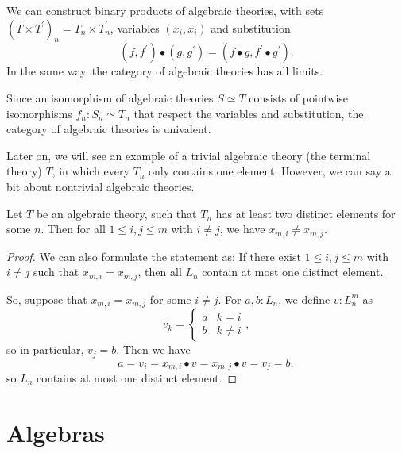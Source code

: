 \begin{remark}\label{rem:algebraic-theory-limits}
  We can construct binary products of algebraic theories, with sets $ (T \times T^\prime)_n = T_n \times T^\prime_n $, variables $ (x_i, x_i) $ and substitution
  \[ (f, f^\prime) \bullet (g, g^\prime) = (f \bullet g, f^\prime \bullet g^\prime). \]
  In the same way, the category of algebraic theories has all limits.
\end{remark}

\begin{remark}
  Since an isomorphism of algebraic theories $ S \simeq T $ consists of pointwise isomorphisms $ f_n: S_n \simeq T_n $ that respect the variables and substitution, the category of algebraic theories is univalent.
\end{remark}

Later on, we will see an example of a trivial algebraic theory (the terminal theory) $ T $, in which every $ T_n $ only contains one element. However, we can say a bit about nontrivial algebraic theories.
\begin{lemma}\label{lem:nontrivial-algebraic-theory}
  Let $ T $ be an algebraic theory, such that $ T_n $ has at least two distinct elements for some $ n $. Then for all $ 1 \leq i, j \leq m $ with $ i \not = j $, we have $ x_{m, i} \not = x_{m, j} $.
\end{lemma}
\begin{proof}
  We can also formulate the statement as: If there exist $ 1 \leq i, j \leq m $ with $ i \not = j $ such that $ x_{m, i} = x_{m, j} $, then all $ L_n $ contain at most one distinct element.

  So, suppose that $ x_{m, i} = x_{m, j} $ for some $ i \not = j $. For $ a, b : L_n $, we define $ v : L_n^m $ as
  \[ v_k = \left\{\begin{array}{ll} a & k = i\\ b & k \not = i \end{array}\right., \]
  so in particular, $ v_j = b $. Then we have
  \[ a = v_i = x_{m, i} \bullet v = x_{m, j} \bullet v = v_j = b, \]
  so $ L_n $ contains at most one distinct element.
\end{proof}

\section{Algebras}

